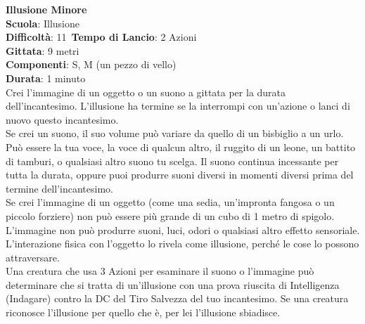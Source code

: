 \begin{multicols}{2}
\medskip\textbf{Illusione Minore}\\
\textbf{Scuola}: Illusione\\
\textbf{Difficoltà}: 11\
\textbf{Tempo di Lancio}: 2 Azioni\\
\textbf{Gittata}: 9 metri\\
\textbf{Componenti}: S, M (un pezzo di vello)\\
\textbf{Durata}: 1 minuto\\
Crei l'immagine di un oggetto o un suono a gittata per la durata dell'incantesimo. L'illusione ha termine se la interrompi con un'azione o lanci di nuovo questo incantesimo.\\
Se crei un suono, il suo volume può variare da quello di un bisbiglio a un urlo. Può essere la tua voce, la voce di qualcun altro, il ruggito di un leone, un battito di tamburi, o qualsiasi altro suono tu scelga. Il suono continua incessante per tutta la durata, oppure puoi produrre suoni diversi in momenti diversi prima del termine dell'incantesimo.\\
Se crei l'immagine di un oggetto (come una sedia, un'impronta fangosa o un piccolo forziere) non può essere più grande di un cubo di 1 metro di spigolo. L'immagine non può produrre suoni, luci, odori o qualsiasi altro effetto sensoriale. L'interazione fisica con l'oggetto lo rivela come illusione, perché le cose lo possono attraversare.\\
Una creatura che usa 3 Azioni per esaminare il suono o l'immagine può determinare che si tratta di un'illusione con una prova riuscita di Intelligenza (Indagare) contro la DC del Tiro Salvezza del tuo incantesimo. Se una creatura riconosce l'illusione per quello che è, per lei l'illusione sbiadisce. 


\end{multicols}
